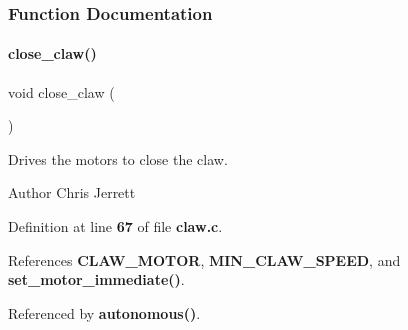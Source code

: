 \subsubsection{Function Documentation}
\mbox{\label{claw_8h_ac42dd40dbb37219295286859c6b068c2}} 
\paragraph{close\+\_\+claw()}
{\footnotesize\ttfamily void close\+\_\+claw (\begin{DoxyParamCaption}{ }\end{DoxyParamCaption})}



Drives the motors to close the claw. 

\begin{DoxyAuthor}{Author}
Chris Jerrett 
\end{DoxyAuthor}


Definition at line \textbf{ 67} of file \textbf{ claw.\+c}.



References \textbf{ C\+L\+A\+W\+\_\+\+M\+O\+T\+OR}, \textbf{ M\+I\+N\+\_\+\+C\+L\+A\+W\+\_\+\+S\+P\+E\+ED}, and \textbf{ set\+\_\+motor\+\_\+immediate()}.



Referenced by \textbf{ autonomous()}.


